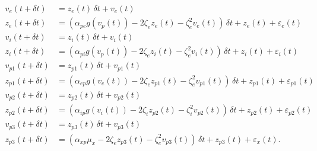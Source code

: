 \documentclass[]{article}
\begin{document}
\begin{align}
	v_e(t+\delta t) &= z_e(t)\,\delta t + v_e(t)\\
	z_e(t+\delta t) &= (\alpha_{pe}g\left(v_p(t)\right) - 2\zeta_{e}z_e(t) - \zeta_{e}^2v_e(t))\,\delta t + z_e(t) + \varepsilon_e(t) \\
	v_i(t+\delta t) &= z_i(t)\,\delta t + v_i(t)\\
	z_i(t+\delta t) &= \left(\alpha_{pi}g\left(v_p(t)\right) - 2\zeta_{e}z_i(t) - \zeta_{e}^2v_i(t)\right)\,\delta t + z_i(t) + \varepsilon_i(t)\\
	v_{p1}(t+\delta t) &= z_{p1}(t)\,\delta t + v_{p1}(t) \\
	z_{p1}(t+\delta t) &= (\alpha_{ep}g\left(v_e(t)\right) - 2\zeta_{e}z_{p1}(t) - \zeta_{e}^2v_{p1}(t))\,\delta t + z_{p1}(t) + \varepsilon_{p1}(t)\\
	v_{p2}(t+\delta t) &= z_{p2}(t)\,\delta t + v_{p2}(t) \\
	z_{p2}(t+\delta t) &= (\alpha_{ip}g\left(v_i(t)\right) - 2\zeta_{i}z_{p2}(t) - \zeta_{i}^2v_{p2}(t))\,\delta t + z_{p2}(t) + \varepsilon_{p2}(t) \\
	v_{p3}(t+\delta t) &= z_{p3}(t)\,\delta t + v_{p3}(t) \\
	z_{p3}(t+\delta t) &= (\alpha_{xp}\mu_x - 2\zeta_{e}z_{p3}(t) - \zeta_{e}^2v_{p3}(t))\,\delta t + z_{p3}(t) + \varepsilon_x(t).
\end{align}
 
\end{document}
